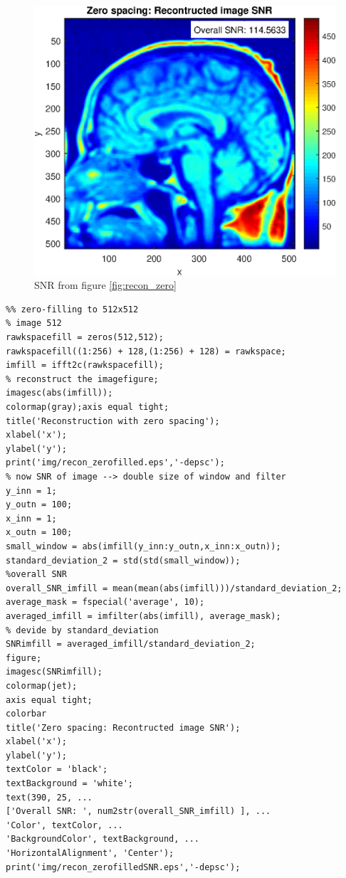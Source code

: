     \begin{figure}[h]
    \centering
    \includegraphics[width=\linewidth] {./homework4/img/recon_zerofilledSNR.eps}
    \caption{SNR from figure \ref{fig:recon_zero}}
    \label{fig:recon_zeroSNR}
    \end{figure}
\clearpage



\begin{lstlisting}
%% zero-filling to 512x512
% image 512
rawkspacefill = zeros(512,512);
rawkspacefill((1:256) + 128,(1:256) + 128) = rawkspace;
imfill = ifft2c(rawkspacefill);
% reconstruct the imagefigure;
imagesc(abs(imfill));
colormap(gray);axis equal tight;
title('Reconstruction with zero spacing');
xlabel('x');
ylabel('y');
print('img/recon_zerofilled.eps','-depsc');
% now SNR of image --> double size of window and filter
y_inn = 1;
y_outn = 100;
x_inn = 1;
x_outn = 100;
small_window = abs(imfill(y_inn:y_outn,x_inn:x_outn));
standard_deviation_2 = std(std(small_window));
%overall SNR
overall_SNR_imfill = mean(mean(abs(imfill)))/standard_deviation_2;
average_mask = fspecial('average', 10);
averaged_imfill = imfilter(abs(imfill), average_mask);
% devide by standard_deviation
SNRimfill = averaged_imfill/standard_deviation_2;
figure;
imagesc(SNRimfill);
colormap(jet);
axis equal tight;
colorbar
title('Zero spacing: Recontructed image SNR');
xlabel('x');
ylabel('y');
textColor = 'black';
textBackground = 'white';
text(390, 25, ...
['Overall SNR: ', num2str(overall_SNR_imfill) ], ...
'Color', textColor, ...
'BackgroundColor', textBackground, ...
'HorizontalAlignment', 'Center');
print('img/recon_zerofilledSNR.eps','-depsc');
\end{lstlisting}





